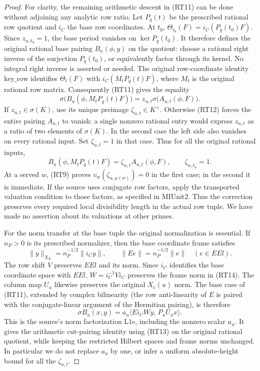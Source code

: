 \begin{proof}
For clarity, the remaining arithmetic descent in (RT11) can
be done without adjoining any analytic row ratio. Let
\(P_q(t)\) be the prescribed rational row quotient and
\(i_C\) the base row coordinates. At \(t_0\),
\(\Theta_{t_0}(F)=i_C(P_q(t_0)F)\).
Since \(z_{u,t_0}=1\), the base period vanishes on
\(\ker P_q(t_0)\). It therefore defines the original
rational base pairing \(B_u(\phi,y)\) on the quotient:
choose a rational right inverse of the surjection
\(P_q(t_0)\), or equivalently factor through its kernel.
No integral right inverse is asserted or needed.
The original row-coordinate identity \(\mathrm{key\_row}\)
identifies \(\Theta_t(F)\) with \(i_C(M_tP_q(t)F)\),
where \(M_t\) is the original rational row matrix.
Consequently (RT11) gives the equality
\[
 \sigma\bigl(B_u(\phi,M_tP_q(t)F)\bigr)
     =z_{u,t}\sigma\bigl(A_{u,t}(\phi,F)\bigr).
 \tag{RT12}
\]
If \(z_{u,t}\in\sigma(K)\), use its unique preimage
\(\zeta_{u,t}\in K^\times\). Otherwise (RT12) forces the
entire pairing \(A_{u,t}\) to vanish: a single nonzero
rational entry would express \(z_{u,t}\) as a ratio of two
elements of \(\sigma(K)\).
In the second case the left side also vanishes on every
rational input. Set \(\zeta_{u,t}=1\) in that case.
Thus for all the original rational inputs,
\[
 B_u(\phi,M_tP_q(t)F)=\zeta_{u,t}A_{u,t}(\phi,F),\qquad
 \zeta_{u,t_0}=1 .
 \tag{RT13}
\]
At a served \(w\), (RT9) proves \(v_w(\zeta_{u,\mu(w)})=0\)
in the first case; in the second it is immediate. If the
source uses conjugate row factors, apply the transported
valuation condition to those factors, as specified in
\(\mathrm{MIUnit2}\). Thus the correction preserves every
required local divisibility length in the actual row tuple.
We have made no assertion about its valuations at other primes.

For the norm transfer at the base tuple the original
normalization is essential. If \(n_P>0\) is its prescribed
normalizer, then the base coordinate frame satisfies
\[
 \|y\|_{X_E}=n_P^{-1/2}\|i_Cy\|,\qquad
 \|Ee\|=n_P^{-1/2}\|e\|\quad(e\in EEl).
 \tag{RT14}
\]
The row shift \(V\) preserves \(EEl\) and its norm.
Since \(i_C\) identifies the base coordinate space with
\(EEl\), \(W=i_C^{-1}Vi_C\) preserves the frame norm in
(RT14). The column map \(U_u\) likewise preserves the
original \(X_c(u)\) norm. The base case of (RT11),
extended by complex bilinearity (the row anti-linearity of
\(E\) is paired with the conjugate-linear argument of the
Hermitian pairing), is therefore
\[
 \sigma B_u(x,y)
       =a_u\langle E i_C W y,\,P_u U_u x\rangle .
 \tag{RT15}
\]
This is the source's norm factorization \(\mathrm{L1e}\),
including the nonzero scalar \(a_u\).
It gives the arithmetic cut-pairing identity using (RT13)
on the original rational quotient, while keeping the
restricted Hilbert spaces and frame norms unchanged.
In particular we do not replace \(a_u\) by one, or infer
a uniform absolute-height bound for all the \(\zeta_{u,t}\).
\end{proof}

